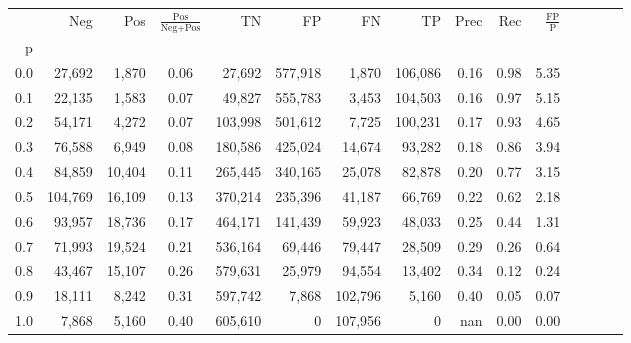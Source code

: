 \begin{tabular}{rrrcrrrrrrrrrrr}
\toprule
{} &      Neg &     Pos & $\frac{\text{Pos}}{\text{Neg}+\text{Pos}}$ &       TN &       FP &       FN &       TP &  Prec &   Rec & $\frac{\text{FP}}{\text{P}}$ \\
p   &          &         &                                            &          &          &          &          &       &       &                              \\
\midrule
0.0 &   27,692 &   1,870 &                                       0.06 &   27,692 &  577,918 &    1,870 &  106,086 &  0.16 &  0.98 &                         5.35 \\
0.1 &   22,135 &   1,583 &                                       0.07 &   49,827 &  555,783 &    3,453 &  104,503 &  0.16 &  0.97 &                         5.15 \\
0.2 &   54,171 &   4,272 &                                       0.07 &  103,998 &  501,612 &    7,725 &  100,231 &  0.17 &  0.93 &                         4.65 \\
0.3 &   76,588 &   6,949 &                                       0.08 &  180,586 &  425,024 &   14,674 &   93,282 &  0.18 &  0.86 &                         3.94 \\
0.4 &   84,859 &  10,404 &                                       0.11 &  265,445 &  340,165 &   25,078 &   82,878 &  0.20 &  0.77 &                         3.15 \\
0.5 &  104,769 &  16,109 &                                       0.13 &  370,214 &  235,396 &   41,187 &   66,769 &  0.22 &  0.62 &                         2.18 \\
0.6 &   93,957 &  18,736 &                                       0.17 &  464,171 &  141,439 &   59,923 &   48,033 &  0.25 &  0.44 &                         1.31 \\
0.7 &   71,993 &  19,524 &                                       0.21 &  536,164 &   69,446 &   79,447 &   28,509 &  0.29 &  0.26 &                         0.64 \\
0.8 &   43,467 &  15,107 &                                       0.26 &  579,631 &   25,979 &   94,554 &   13,402 &  0.34 &  0.12 &                         0.24 \\
0.9 &   18,111 &   8,242 &                                       0.31 &  597,742 &    7,868 &  102,796 &    5,160 &  0.40 &  0.05 &                         0.07 \\
1.0 &    7,868 &   5,160 &                                       0.40 &  605,610 &        0 &  107,956 &        0 &   nan &  0.00 &                         0.00 \\
\bottomrule
\end{tabular}
